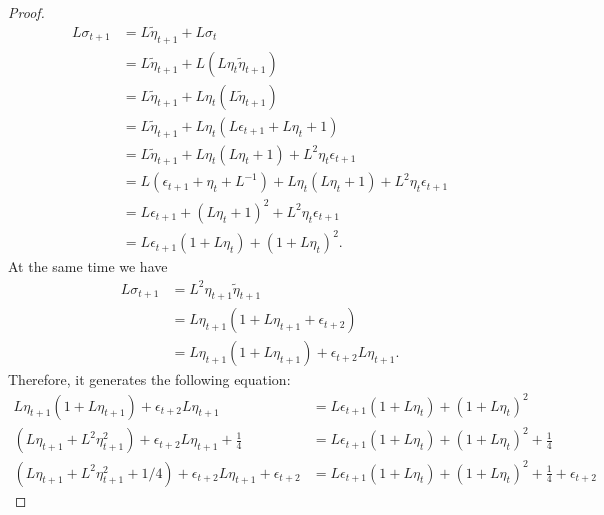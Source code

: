 \begin{proof}
        \begin{align*}
            L \sigma_{t + 1} &= L \tilde \eta_{t + 1} + L \sigma_t
            \\
            &=
            L \tilde \eta_{t + 1}  + L (L \eta_t \tilde \eta_{t + 1})
            \\
            &= L \tilde \eta_{t+ 1} + L \eta_t (L \tilde \eta_{t + 1})
            \\
            &=  L \tilde \eta_{t+ 1} + L \eta_t (L \epsilon_{t + 1} + L \eta_t + 1)
            \\
            &=  L \tilde \eta_{t+ 1} + L \eta_t (L \eta_t + 1) + L^2 \eta_t \epsilon_{t + 1}
            \\
            &= L (\epsilon_{t +1} + \eta_t + L^{-1}) + L\eta_t(L \eta_t + 1) + L^2\eta_t \epsilon_{t + 1}
            \\
            &= L \epsilon_{t + 1} + (L\eta_t + 1)^2 + L^2\eta_t \epsilon_{t + 1}
            \\
            &= 
            L \epsilon_{t + 1}(1 + L \eta_t) + (1 + L \eta_t)^2. 
        \end{align*}
        At the same time we have 
        \begin{align*}
            L \sigma_{t + 1} &= L^2 \eta_{t + 1}\tilde \eta_{t + 1} 
            \\
            &= L\eta_{t + 1}(1 + L \eta_{t + 1} + \epsilon_{t + 2})
            \\
            &= L\eta_{t + 1}(1 + L \eta_{t + 1}) + \epsilon_{t + 2}L\eta_{t + 1}. 
        \end{align*}
        Therefore, it generates the following equation: 
        \begin{align*}
            L\eta_{t + 1} (1 + L \eta_{t + 1}) 
            + 
            \epsilon_{t + 2} L \eta_{t + 1} 
            &= 
            L\epsilon_{t + 1}(1 + L \eta_t)  + (1 + L\eta_t)^2
            \\
            (L\eta_{t + 1} + L^2\eta_{t + 1}^2)
            + 
            \epsilon_{t + 2} L \eta_{t + 1} 
            + 
            \frac{1}{4}
            &= 
            L\epsilon_{t + 1}(1 + L \eta_t)  + (1 + L\eta_t)^2
            + 
            \frac{1}{4}
            \\
            (L\eta_{t + 1} + L^2\eta_{t + 1}^2 + 1/4)
            + 
            \epsilon_{t + 2} L \eta_{t + 1} 
            + \epsilon_{t + 2}
            &= 
            L\epsilon_{t + 1}(1 + L \eta_t)  + (1 + L\eta_t)^2
            + \frac{1}{4}
            + \epsilon_{t + 2}

\end{align*}
\end{proof}
